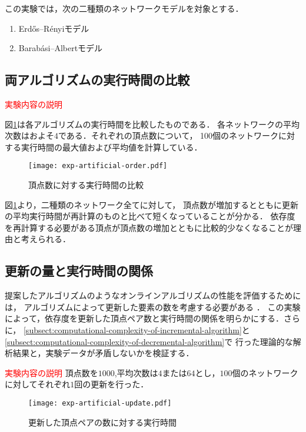 この実験では，次の二種類のネットワークモデルを対象とする．
\begin{enumerate}
\item Erd\H{o}s--R\'{e}nyiモデル\cite{Erdos1959}
\item Barab\'{a}si--Albertモデル\cite{Barabasi1999}
\end{enumerate}

\subsection{両アルゴリズムの実行時間の比較}
\textcolor{red}{実験内容の説明}

図\ref{fig:exp-artificial-order}は各アルゴリズムの実行時間を比較したものである．
各ネットワークの平均次数はおよそ$4$である．それぞれの頂点数について，
100個のネットワークに対する実行時間の最大値および平均値を計算している．

\begin{figure}[tb]
  \centering
  \texttt{[image: exp-artificial-order.pdf]}
  \caption{頂点数に対する実行時間の比較}
  \label{fig:exp-artificial-order}
\end{figure}

図\ref{fig:exp-artificial-order}より，二種類のネットワーク全てに対して，
頂点数が増加するとともに更新の平均実行時間が再計算のものと比べて短くなっていることが分かる．
依存度を再計算する必要がある頂点が頂点数の増加とともに比較的少なくなることが理由と考えられる．

\subsection{更新の量と実行時間の関係}

提案したアルゴリズムのようなオンラインアルゴリズムの性能を評価するためには，
アルゴリズムによって更新した要素の数を考慮する必要がある
\cite{Ramalingam1996,Lee2012,Pontecorvi2014}．
この実験によって，依存度を更新した頂点ペア数と実行時間の関係を明らかにする．さらに，
\ref{subsect:computational-complexity-of-incremental-algorithm}と
\ref{subsect:computational-complexity-of-decremental-algorithm}で
行った理論的な解析結果と，実験データが矛盾しないかを検証する．

\textcolor{red}{実験内容の説明}
頂点数を$1000$,平均次数は$4$または$64$とし，$100$個のネットワークに対してそれぞれ$1$回の更新を行った．

\begin{figure}[tb]
  \centering
  \texttt{[image: exp-artificial-update.pdf]}
  \caption{更新した頂点ペアの数に対する実行時間}
  \label{fig:exp-artificial-update}
\end{figure}

